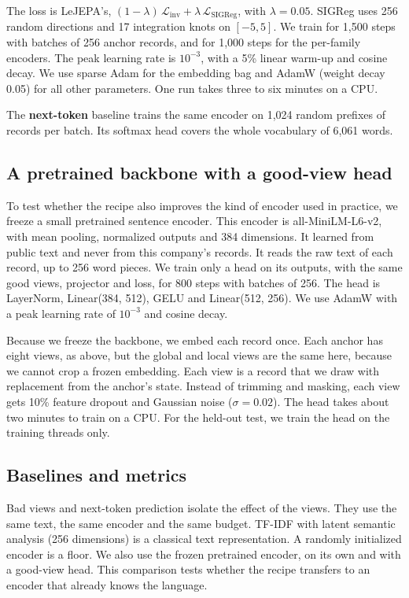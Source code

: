 \documentclass[11pt]{article}
\begin{document}
The loss is LeJEPA's, $(1-\lambda)\,\mathcal{L}_{\text{inv}} + \lambda\,\mathcal{L}_{\text{SIGReg}}$, with $\lambda = 0.05$. SIGReg uses 256 random directions and 17 integration knots on $[-5,5]$. We train for 1{,}500 steps with batches of 256 anchor records, and for 1{,}000 steps for the per-family encoders. The peak learning rate is $10^{-3}$, with a 5\% linear warm-up and cosine decay. We use sparse Adam for the embedding bag and AdamW (weight decay 0.05) for all other parameters. One run takes three to six minutes on a CPU.

The \textcolor{ntpaqua}{\textbf{next-token}} baseline trains the same encoder on 1{,}024 random prefixes of records per batch. Its softmax head covers the whole vocabulary of 6{,}061 words.

\subsection{A pretrained backbone with a good-view head}
To test whether the recipe also improves the kind of encoder used in practice, we freeze a small pretrained sentence encoder. This encoder is all-MiniLM-L6-v2\citep{reimers2019sbert,wang2020minilm}, with mean pooling, normalized outputs and 384 dimensions. It learned from public text and never from this company's records. It reads the raw text of each record, up to 256 word pieces. We train only a head on its outputs, with the same good views, projector and loss, for 800 steps with batches of 256. The head is LayerNorm, Linear(384, 512), GELU and Linear(512, 256). We use AdamW with a peak learning rate of $10^{-3}$ and cosine decay.

Because we freeze the backbone, we embed each record once. Each anchor has eight views, as above, but the global and local views are the same here, because we cannot crop a frozen embedding. Each view is a record that we draw with replacement from the anchor's state. Instead of trimming and masking, each view gets 10\% feature dropout and Gaussian noise ($\sigma = 0.02$). The head takes about two minutes to train on a CPU. For the held-out test, we train the head on the training threads only.

\subsection{Baselines and metrics}
Bad views and next-token prediction isolate the effect of the views. They use the same text, the same encoder and the same budget. TF-IDF with latent semantic analysis (256 dimensions) is a classical text representation. A randomly initialized encoder is a floor. We also use the frozen pretrained encoder, on its own and with a good-view head. This comparison tests whether the recipe transfers to an encoder that already knows the language.
\end{document}
